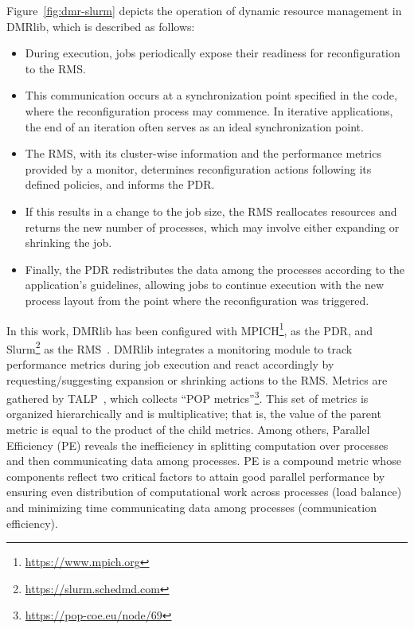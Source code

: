\documentclass[a4paper,fleqn]{cas-dc}
\begin{document}
Figure~\ref{fig:dmr-slurm} depicts the operation of dynamic resource management in DMRlib, which is described as follows:

\begin{itemize}
\item During execution, jobs periodically expose their readiness for reconfiguration to the RMS.
\item This communication occurs at a synchronization point specified in the code, where the reconfiguration process may commence. In iterative applications, the end of an iteration often serves as an ideal synchronization point.
\item The RMS, with its cluster-wise information and the performance metrics provided by a monitor, determines reconfiguration actions following its defined policies, and informs the PDR.
\item If this results in a change to the job size, the RMS reallocates resources and returns the new number of processes, which may involve either expanding or shrinking the job.
\item Finally, the PDR redistributes the data among the processes according to the application's guidelines, allowing jobs to continue execution with the new process layout from the point where the reconfiguration was triggered.
\end{itemize}


In this work, DMRlib has been configured with MPICH\footnote{\url{https://www.mpich.org}}, as the PDR, and Slurm\footnote{\url{https://slurm.schedmd.com}} as the RMS~\cite{iserte_towards_2025}.
DMRlib integrates a monitoring module to track performance metrics during job execution and react accordingly by requesting/suggesting expansion or shrinking actions to the RMS.
Metrics are gathered by TALP~\cite{lopez_talp_2021}, which collects ``POP metrics''\footnote{\url{https://pop-coe.eu/node/69}}. This set of metrics is organized hierarchically and is multiplicative; that is, the value of the parent metric is equal to the product of the child metrics.
Among others, Parallel Efficiency (PE) reveals the inefficiency in splitting computation over processes and then communicating data among processes.
PE is a compound metric whose components reflect two critical factors to attain good parallel performance by ensuring even distribution of computational work across processes (load balance) and minimizing time communicating data among processes (communication efficiency).
\end{document}
